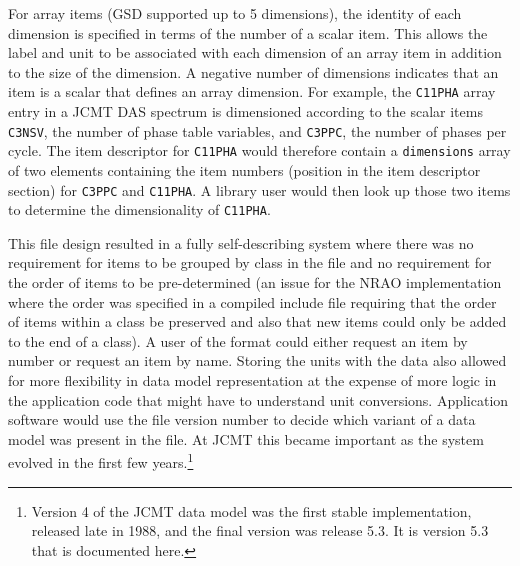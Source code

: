 \documentclass[final,authoryear,5p,times,twocolumn]{elsarticle}
\begin{document}
For array items (GSD supported up to 5 dimensions), the
identity of each dimension is specified in terms of the number of a
scalar item. This allows the label and unit to be associated with each
dimension of an array item in addition to the size of the dimension. A
negative number of dimensions indicates that an item is a scalar that
defines an array dimension. For example, the \texttt{C11PHA} array
entry in a JCMT DAS spectrum \citep{1986SPIE..598..134B} is
dimensioned according to the scalar items \texttt{C3NSV}, the number
of phase table variables, and \texttt{C3PPC}, the number of phases per
cycle. The item descriptor for \texttt{C11PHA} would therefore contain
a \texttt{dimensions} array of two elements containing the item
numbers (position in the item descriptor section) for \texttt{C3PPC}
and \texttt{C11PHA}. A library user would then look up those two items
to determine the dimensionality of \texttt{C11PHA}.

This file design resulted in a fully self-describing system
where there was no requirement for items to be grouped by class in the
file and no requirement for the order of items to be pre-determined
(an issue for the NRAO implementation where the order was specified in
a compiled include file requiring that the order of items within a
class be preserved and also that new items could only be added to the
end of a class). A user of the format could either
request an item by number or request an item by name. Storing the
units with the data also allowed for more flexibility in data model
representation at the expense of more logic in the application code
that might have to understand unit conversions. Application software
would use the file version number to decide which variant of a data
model was present in the file. At JCMT this became important as the
system evolved in the first few years.\footnote{Version 4 of the JCMT
  data model was the first stable implementation, released late in
  1988, and the final version was release 5.3. It is version 5.3 that
  is documented here.}
\end{document}
